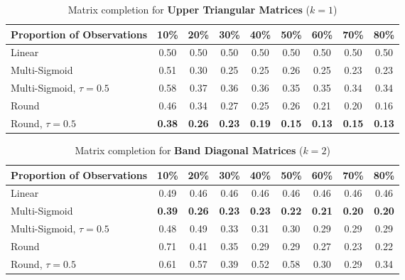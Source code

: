 \documentclass{article}
\begin{document}
\begin{table*}[tb]
	\centering
	\caption{Matrix completion for \textbf{Upper Triangular Matrices} ($k=1$)}
	\label{tab:MC-UT}
\begin{tabular}{lcccccccc}
\toprule
Proportion of Observations& 10\%& 20\%& 30\%& 40\%& 50\%& 60\%& 70\%& 80\% \\ %
\midrule
Linear&0.50&0.50&0.50&0.50&0.50&0.50&0.50&0.50\\ %
\addlinespace
Multi-Sigmoid&0.51&0.30&0.25&0.25&0.26&0.25&0.23&0.23\\ %
Multi-Sigmoid, $\tau=0.5$&0.58&0.37&0.36&0.36&0.35&0.35&0.34&0.34\\ %
Round&0.46&0.34&0.27&0.25&0.26&0.21&0.20&0.16\\ %
Round, $\tau=0.5$&\bf{0.38}&\bf{0.26}&\bf{0.23}&\bf{0.19}&\bf{0.15}&\bf{0.13}&\bf{0.15}&\bf{0.13}\\ %
\bottomrule
\end{tabular}
\end{table*}
\begin{table*}[tb]
	\centering
	\caption{Matrix completion for \textbf{Band Diagonal Matrices} ($k=2$)}
	\label{tab:MC-BD}
\begin{tabular}{lcccccccc}
\toprule
Proportion of Observations& 10\%& 20\%& 30\%& 40\%& 50\%& 60\%& 70\%& 80\% \\ \midrule
Linear&0.49&0.46&0.46&0.46&0.46&0.46&0.46&0.46\\ %
\addlinespace
Multi-Sigmoid&\bf{0.39}&\bf{0.26}&\bf{0.23}&\bf{0.23}&\bf{0.22}&\bf{0.21}&\bf{0.20}&\bf{0.20}\\ %
Multi-Sigmoid, $\tau=0.5$&0.48&0.49&0.33&0.31&0.30&0.29&0.29&0.29\\ %
Round&0.71&0.41&0.35&0.29&0.29&0.27&0.23&0.22\\ %
Round, $\tau=0.5$&0.61&0.57&0.39&0.52&0.58&0.30&0.29&0.34\\ \bottomrule
\end{tabular}
\end{table*}
\end{document}
